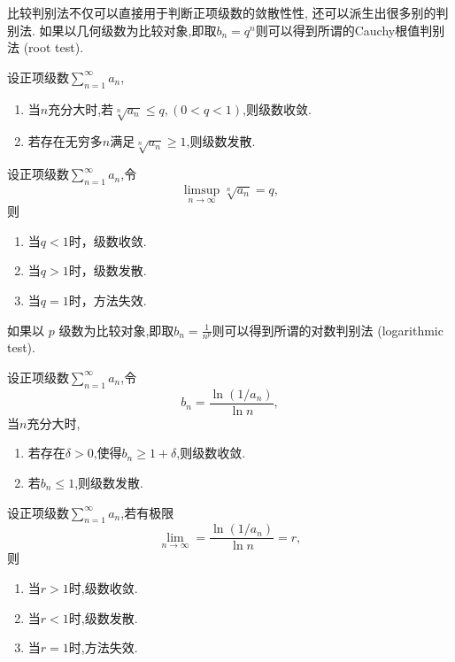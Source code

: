 比较判别法不仅可以直接用于判断正项级数的敛散性性, 还可以派生出很多别的判别法. 如果以几何级数为比较对象,即取$b_n=q^n$则可以得到所谓的Cauchy根值判别法 (root test).

\begin{theorem}[Cauchy根值判别法]
    设正项级数$\sum_{n=1}^\infty a_n$,
    \begin{enumerate}
        \item 当$n$充分大时,若$\sqrt[n]{a_n}\leq q,(0<q<1)$,则级数收敛.
        \item 若存在无穷多$n$满足$\sqrt[n]{a_n}\geq 1$,则级数发散.
    \end{enumerate}
\end{theorem}

\begin{theorem}[Cauchy根值判别法的极限形式]
    设正项级数$\sum_{n=1}^\infty a_n$,令
    \[\limsup_{n\to\infty}\sqrt[n]{a_n}=q,\]
    则
    \begin{enumerate}
        \item 当$q<1$时，级数收敛.
        \item 当$q>1$时，级数发散.
        \item 当$q=1$时，方法失效.
    \end{enumerate}
\end{theorem}

如果以 $p$ 级数为比较对象,即取$b_n=\frac{1}{n^p}$则可以得到所谓的对数判别法 (logarithmic test).

\begin{proposition}[对数判别法]
    设正项级数$\sum_{n=1}^\infty a_n$,令
    \[b_n=\frac{\ln(1/a_n)}{\ln n},\]
    当$n$充分大时,
    \begin{enumerate}
        \item 若存在$\delta>0$,使得$b_n\ge 1+\delta$,则级数收敛.
        \item 若$b_n\le 1$,则级数发散.
    \end{enumerate}
\end{proposition}

\begin{proposition}[对数判别法的极限形式]
    设正项级数$\sum_{n=1}^\infty a_n$,若有极限
    \[\lim_{n\to\infty}=\frac{\ln(1/a_n)}{\ln n}=r,\]
    则
    \begin{enumerate}
        \item 当$r>1$时,级数收敛.
        \item 当$r<1$时,级数发散.
        \item 当$r=1$时,方法失效.
    \end{enumerate}
    
\end{proposition}

